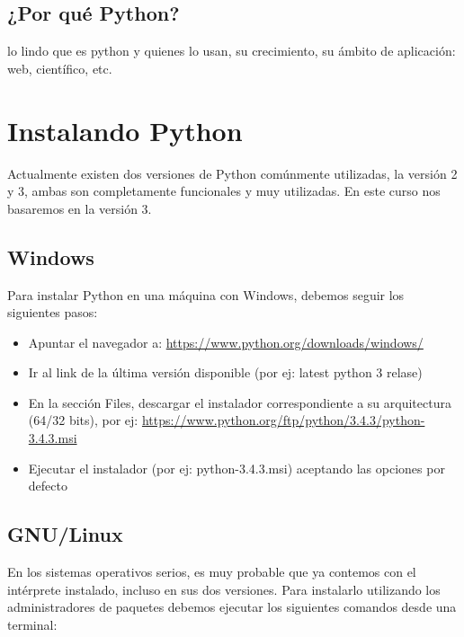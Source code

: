 \documentclass[a4paper,12pt,spanish]{sphinxmanual}
\begin{document}
\subsection{¿Por qué Python?}
\label{Unidad01:por-que-python}
lo lindo que es python y quienes lo usan, su crecimiento, su ámbito de
aplicación: web, científico, etc.


\section{Instalando Python}
\label{Unidad01:instalando-python}
Actualmente existen dos versiones de Python comúnmente utilizadas, la
versión 2 y 3, ambas son completamente funcionales y muy utilizadas. En
este curso nos basaremos en la versión 3.


\subsection{Windows}
\label{Unidad01:windows}
Para instalar Python en una máquina con Windows, debemos seguir los
siguientes pasos:
\begin{itemize}
\item {} 
Apuntar el navegador a: \href{https://www.python.org/downloads/windows/}{https://www.python.org/downloads/windows/}

\item {} 
Ir al link de la última versión disponible (por ej: latest python 3
relase)

\item {} 
En la sección Files, descargar el instalador correspondiente a su
arquitectura (64/32 bits), por ej:
\href{https://www.python.org/ftp/python/3.4.3/python-3.4.3.msi}{https://www.python.org/ftp/python/3.4.3/python-3.4.3.msi}

\item {} 
Ejecutar el instalador (por ej: python-3.4.3.msi) aceptando las
opciones por defecto

\end{itemize}


\subsection{GNU/Linux}
\label{Unidad01:gnu-linux}
En los sistemas operativos serios, es muy probable que ya contemos con
el intérprete instalado, incluso en sus dos versiones. Para instalarlo
utilizando los administradores de paquetes debemos ejecutar los
siguientes comandos desde una terminal:
\end{document}
